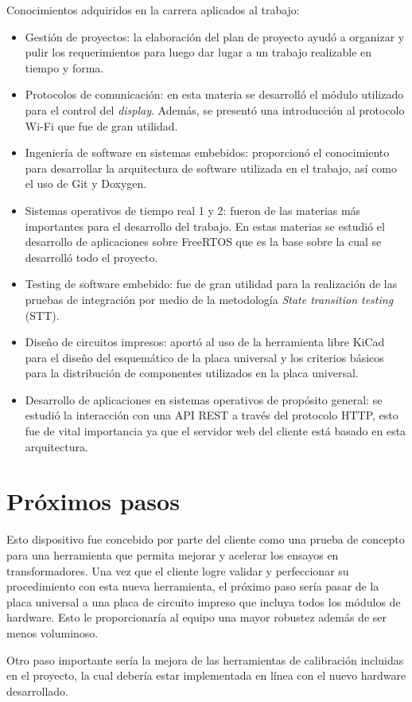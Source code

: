 Conocimientos adquiridos en la carrera aplicados al trabajo:
\begin{itemize}
\item Gestión de proyectos: la elaboración del plan de proyecto ayudó a organizar y pulir los requerimientos para luego dar lugar a un trabajo realizable en tiempo y forma.
\item Protocolos de comunicación: en esta materia se desarrolló el módulo utilizado para el control del \textit{display}. Además, se presentó una introducción al protocolo Wi-Fi que fue de gran utilidad.
\item Ingeniería de software en sistemas embebidos: proporcionó el conocimiento para desarrollar la arquitectura de software utilizada en el trabajo, así como el uso de Git y Doxygen.
\item Sistemas operativos de tiempo real 1 y 2: fueron de las materias más importantes para el desarrollo del trabajo. En estas materias se estudió el desarrollo de aplicaciones sobre FreeRTOS que es la base sobre la cual se desarrolló todo el proyecto.
\item Testing de software embebido: fue de gran utilidad para la realización de las pruebas de integración por medio de la metodología \textit{State transition testing} (STT).
\item Diseño de circuitos impresos: aportó al uso de la herramienta libre KiCad para el diseño del esquemático de la placa universal y los criterios básicos para la distribución de componentes utilizados en la placa universal.
\item Desarrollo de aplicaciones en sistemas operativos de propósito general: se estudió la interacción con una API REST a través del protocolo HTTP, esto fue de vital importancia ya que el servidor web del cliente está basado en esta arquitectura.
\end{itemize}

\section{Próximos pasos}

Esto dispositivo fue concebido por parte del cliente como una prueba de concepto para una herramienta que permita mejorar y acelerar los ensayos en transformadores. Una vez que el cliente logre validar y perfeccionar su procedimiento con esta nueva herramienta, el próximo paso sería pasar de la placa universal a una placa de circuito impreso que incluya todos los módulos de hardware. Esto le proporcionaría al equipo una mayor robustez además de ser menos voluminoso.

Otro paso importante sería la mejora de las herramientas de calibración incluidas en el proyecto, la cual debería estar implementada en línea con el nuevo hardware desarrollado.